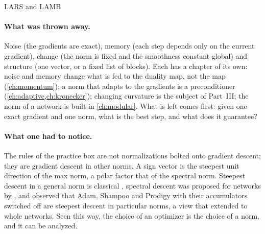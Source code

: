 \begin{refsection}
\begin{fieldguide}{LARS and LAMB}{\textcite{YouGitmanGinsburg2017,YouEtAl2020}}
\end{fieldguide}

\paragraph{What was thrown away.} Noise (the gradients are exact), memory (each step depends only on the current gradient), change (the norm is fixed and the smoothness constant global) and structure (one vector, or a fixed list of blocks). Each has a chapter of its own: noise and memory change what is fed to the duality map, not the map (\cref{ch:momentum}); a norm that adapts to the gradients is a preconditioner (\cref{ch:adaptive,ch:kronecker}); changing curvature is the subject of Part~III; the norm of a network is built in \cref{ch:modular}. What is left comes first: given one exact gradient and one norm, what is the best step, and what does it guarantee?

\paragraph{What one had to notice.} The rules of the practice box are not normalizations bolted onto gradient descent; they are gradient descent in other norms. A sign vector is the steepest unit direction of the max norm, a polar factor that of the spectral norm. Steepest descent in a general norm is classical \parencite{BoydVandenberghe2004}, spectral descent was proposed for networks by \textcite{CarlsonEtAl2015}, and \textcite{BernsteinNewhouse2024} observed that Adam, Shampoo and Prodigy with their accumulators switched off are steepest descent in particular norms, a view that \textcite{LargeEtAl2024,BernsteinNewhouse2025} extended to whole networks. Seen this way, the choice of an optimizer is the choice of a norm, and it can be analyzed.


\end{refsection}
